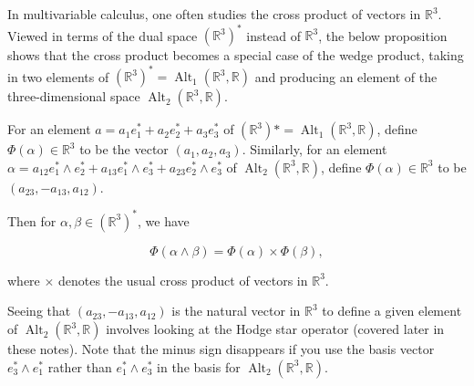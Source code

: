 In multivariable calculus, one often studies the cross product of vectors in \(\mathbb{R}^3\). Viewed in terms of the dual space \((\mathbb{R}^3)^*\) instead of \(\mathbb{R}^3\), the below proposition shows that the cross product becomes a special case of the wedge product, taking in two elements of \((\mathbb{R}^3)^* = \operatorname{Alt}_1(\mathbb{R}^3, \mathbb{R})\) and producing an element of the three-dimensional space \(\operatorname{Alt}_2(\mathbb{R}^3, \mathbb{R})\).

\begin{proposition}\label{ra.42b.hw14.prob.2}

For an element \(a = a_1 e_1^* + a_2 e_2^* + a_3 e_3^*\) of \((\mathbb{R}^3)* = \operatorname{Alt}_1(\mathbb{R}^3, \mathbb{R})\), define \(\Phi(\alpha) \in \mathbb{R}^3\) to be the vector \((a_1, a_2, a_3)\). Similarly, for an element \(\alpha = a_{12} e_1^* \wedge e_2^* + a_{13} e_1^* \wedge e_3^* + a_{23} e_2^* \wedge e_3^*\) of \(\operatorname{Alt}_2(\mathbb{R}^3, \mathbb{R})\), define \(\Phi(\alpha) \in \mathbb{R}^3\) to be \((a_{23}, -a_{13}, a_{12})\).

Then for \(\alpha, \beta \in (\mathbb{R}^3)^*\), we have 

\[
\Phi(\alpha \wedge \beta) = \Phi(\alpha) \times \Phi(\beta),
\]

where \(\times\) denotes the usual cross product of vectors in \(\mathbb{R}^3\).

\end{proposition}



\begin{remark}

Seeing that \((a_{23}, -a_{13}, a_{12})\) is the natural vector in \(\mathbb{R}^3\) to define a given element of \(\operatorname{Alt}_2(\mathbb{R}^3, \mathbb{R})\) involves looking at the Hodge star operator (covered later in these notes). Note that the minus sign disappears if you use the basis vector \(e_3^* \wedge e_1^*\) rather than \(e_1^* \wedge e_3^*\) in the basis for \(\operatorname{Alt}_2(\mathbb{R}^3, \mathbb{R})\).

\end{remark}

